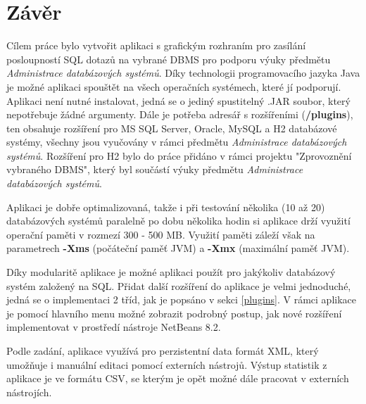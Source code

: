 \documentclass[czech,bachelor,public,dept460,male,cpdeclaration,twoside]{diploma}
\begin{document}
\section{Závěr}
Cílem práce bylo vytvořit aplikaci s grafickým rozhraním pro zasílání posloupností SQL dotazů na vybrané DBMS pro podporu výuky předmětu \textit{Administrace databázových systémů}. Díky technologii programovacího jazyka Java je možné aplikaci spouštět na všech operačních systémech, které jí podporují. Aplikaci není nutné instalovat, jedná se o jediný spustitelný .JAR soubor, který nepotřebuje žádné argumenty. Dále je potřeba adresář s rozšířeními (\textbf{/plugins}), ten obsahuje rozšíření pro MS SQL Server, Oracle, MySQL a H2 databázové systémy, všechny jsou vyučovány v rámci předmětu \textit{Administrace databázových systémů}. Rozšíření pro H2 bylo do práce přidáno v rámci projektu "Zprovoznění vybraného DBMS", který byl součástí výuky předmětu \textit{Administrace databázových systémů}.

Aplikaci je dobře optimalizovaná, takže i při testování několika (10 až 20) databázových systémů paralelně po dobu několika hodin si aplikace drží využití operační paměti v rozmezí 300 - 500 MB. Využití paměti záleží však na parametrech \textbf{-Xms} (počáteční paměť JVM) a \textbf{-Xmx} (maximální paměť JVM).

Díky modularitě aplikace je možné aplikaci použít pro jakýkoliv databázový systém založený na SQL. Přidat další rozšíření do aplikace je velmi jednoduché, jedná se o implementaci 2 tříd, jak je popsáno v sekci \ref{plugins}. V rámci aplikace je pomocí hlavního menu možné zobrazit podrobný postup, jak nové rozšíření implementovat v prostředí nástroje NetBeans 8.2.

Podle zadání, aplikace využívá pro perzistentní data formát XML, který umožňuje i manuální editaci pomocí externích nástrojů. Výstup statistik z aplikace je ve formátu CSV, se kterým je opět možné dále pracovat v externích nástrojích. 
\end{document}

